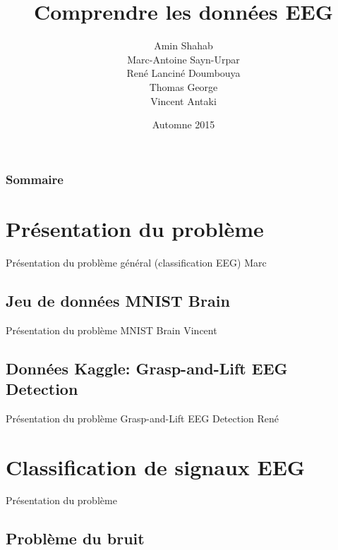 \documentclass{beamer}
\title[Interpréter des données EEG]{Comprendre les données EEG}
\author{Amin Shahab\\Marc-Antoine Sayn-Urpar\\René Lanciné Doumbouya\\Thomas George\\Vincent Antaki}
\institute{IFT6390}
\date{Automne 2015}
\begin{document}
\begin{frame}
\titlepage
\end{frame}

\begin{frame}
\frametitle{Sommaire}
\tableofcontents
\end{frame}

\section[Présentation du problème]{Présentation du problème}

\begin{frame}{Présentation du problème général (classification EEG)}
Marc

\end{frame}

\subsection[Données MNIST Brain]{Jeu de données MNIST Brain}

\begin{frame}{Présentation du problème MNIST Brain}
Vincent

\end{frame}

\subsection[Données Kaggle]{Données Kaggle: Grasp-and-Lift EEG Detection}

\begin{frame}{Présentation du problème Grasp-and-Lift EEG Detection}
René

\end{frame}

\section[Classification de signaux EEG]{Classification de signaux EEG}

\begin{frame}{Présentation du problème}

\end{frame}

\subsection[Problème du bruit]{Problème du bruit}
\end{document}

